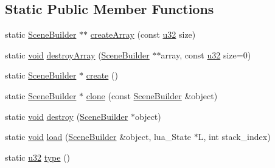 \subsection*{Static Public Member Functions}
\begin{DoxyCompactItemize}
\item 
static \mbox{\hyperlink{classnjli_1_1_scene_builder}{Scene\+Builder}} $\ast$$\ast$ \mbox{\hyperlink{classnjli_1_1_scene_builder_a969a8dfd6b03041f2c1ab018a459188d}{create\+Array}} (const \mbox{\hyperlink{_util_8h_a10e94b422ef0c20dcdec20d31a1f5049}{u32}} size)
\item 
static \mbox{\hyperlink{_thread_8h_af1e856da2e658414cb2456cb6f7ebc66}{void}} \mbox{\hyperlink{classnjli_1_1_scene_builder_a2fdae0dad7bc105720ec40e4500455f7}{destroy\+Array}} (\mbox{\hyperlink{classnjli_1_1_scene_builder}{Scene\+Builder}} $\ast$$\ast$array, const \mbox{\hyperlink{_util_8h_a10e94b422ef0c20dcdec20d31a1f5049}{u32}} size=0)
\item 
static \mbox{\hyperlink{classnjli_1_1_scene_builder}{Scene\+Builder}} $\ast$ \mbox{\hyperlink{classnjli_1_1_scene_builder_aa4f2fe2401942a03809494d03a9f76d7}{create}} ()
\item 
static \mbox{\hyperlink{classnjli_1_1_scene_builder}{Scene\+Builder}} $\ast$ \mbox{\hyperlink{classnjli_1_1_scene_builder_ada4fdb5701ec3f8167c7c27d0e26828c}{clone}} (const \mbox{\hyperlink{classnjli_1_1_scene_builder}{Scene\+Builder}} \&object)
\item 
static \mbox{\hyperlink{_thread_8h_af1e856da2e658414cb2456cb6f7ebc66}{void}} \mbox{\hyperlink{classnjli_1_1_scene_builder_a7cc2b228996ae221236decdcd8c4211f}{destroy}} (\mbox{\hyperlink{classnjli_1_1_scene_builder}{Scene\+Builder}} $\ast$object)
\item 
static \mbox{\hyperlink{_thread_8h_af1e856da2e658414cb2456cb6f7ebc66}{void}} \mbox{\hyperlink{classnjli_1_1_scene_builder_af9d2a17c5d96f81fe52bdc0e1153caee}{load}} (\mbox{\hyperlink{classnjli_1_1_scene_builder}{Scene\+Builder}} \&object, lua\+\_\+\+State $\ast$L, int stack\+\_\+index)
\item 
static \mbox{\hyperlink{_util_8h_a10e94b422ef0c20dcdec20d31a1f5049}{u32}} \mbox{\hyperlink{classnjli_1_1_scene_builder_a35e422e5b7dad78581a730934fce3019}{type}} ()
\end{DoxyCompactItemize}
